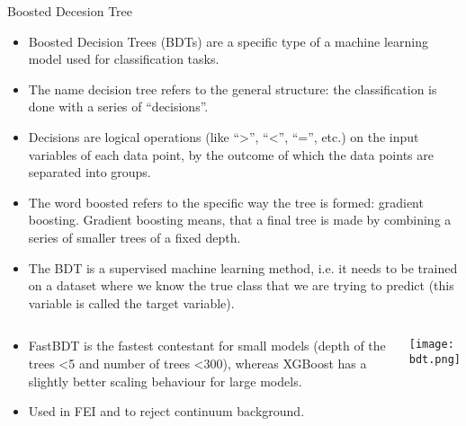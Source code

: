 \documentclass[12pt]{beamer}
\begin{document}
	\begin{frame}[t]{Boosted Decesion Tree}
	\begin{scriptsize}
		\begin{itemize}
			\item Boosted Decision Trees (BDTs) are a specific type of a machine learning model used for classification tasks.
			\item The name decision tree refers to the general structure: the classification is done with a series of “decisions”.
			\item Decisions are logical operations (like “>”, “<”, “=”, etc.) on the input variables of each data point, by the outcome of which the data points are separated into groups.
			\item The word boosted refers to the specific way the tree is formed: gradient boosting. Gradient boosting means, that a final tree is made by combining a series of smaller trees of a fixed depth.
			\item The BDT is a supervised machine learning method, i.e. it needs to be trained on a dataset where we know the true class that we are trying to predict (this variable is called the target variable).
		\end{itemize}
	\end{scriptsize}
	\begin{columns}
		\hspace{0.5cm}
			\begin{scriptsize}
				\vspace{-0.5cm}
		\begin{itemize}
			\item FastBDT is the fastest contestant for small models (depth of the trees <5 and number of trees <300), whereas XGBoost has a slightly better scaling behaviour for large models.
			\item Used in FEI and to reject continuum background. 
		\end{itemize}
		\end{scriptsize}
		\vspace{-0.4cm}
		\texttt{[image: bdt.png]}
		
	\end{columns}
	\end{frame}

		
\end{document}
